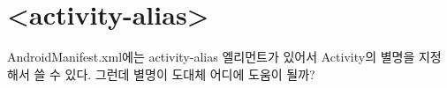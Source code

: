 \section{<activity-alias>}
AndroidManifest.xml에는 activity-alias 엘리먼트가 있어서 Activity의 별명을 지정해서 쓸 수 있다. 그런데 별명이 도대체 어디에 도움이 될까?

